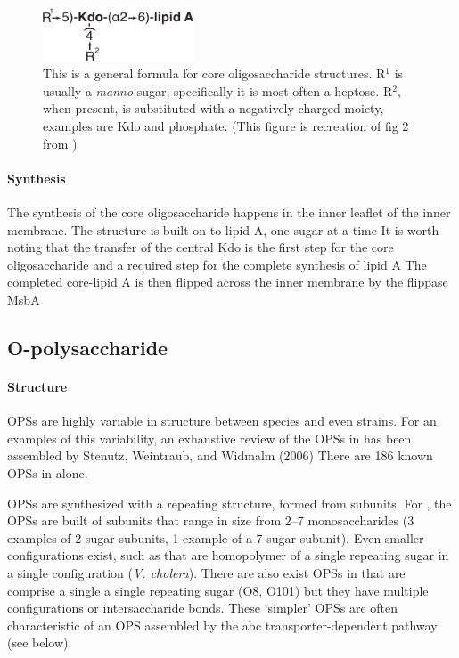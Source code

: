 \begin{figure}[htb]
  	\begin{center}
   		\includegraphics[width=0.4\textwidth]{intro/img/coreformula.pdf}
   	\end{center}
   	\caption[A generalized formula for core oligosaccharides]{This is a general formula for core oligosaccharide structures. R$^1$ is usually a \textit{manno} sugar, specifically it is most often a heptose. R$^2$, when present, is substituted with a negatively charged moiety, examples are Kdo and phosphate. (This figure is recreation of fig 2 from )
}
\label{fig:coreformula}
\end{figure}   

    \paragraph{Synthesis}
 The synthesis of the core oligosaccharide happens in the inner leaflet of the inner membrane. The structure is built on to lipid A, one sugar at a time It is worth noting that the transfer of the central Kdo is the first step for the core oligosaccharide and a required step for the complete synthesis of lipid A The completed core-lipid A is then flipped across the inner membrane by the flippase MsbA

  \subsection{O-polysaccharide}\label{sec:o-polysaccharide}

    \paragraph{Structure}
    \Acp{OPS} are highly variable in structure between species and even strains. For an examples of this variability, an exhaustive review of the \acp{OPS} in \ecoli has been assembled by Stenutz, Weintraub, and Widmalm (2006) There are 186 known \acp{OPS} in \ecoli alone. 

\Acp{OPS} are synthesized with a repeating structure, formed from subunits. For \ecoli, the \acp{OPS} are built of subunits that range in size from 2--7 monosaccharides (3 examples of 2 sugar subunits, 1 example of a 7 sugar subunit).  Even smaller configurations exist, such as that are homopolymer of a single repeating sugar in a single configuration (\eg \textit{V. cholera}). There are also exist \acp{OPS} in \ecoli that are comprise a single a single repeating sugar (O8, O101) but they have multiple configurations or intersaccharide bonds. These `simpler' \acp{OPS} are often characteristic of an \ac{OPS} assembled by the \ac{abc} transporter-dependent pathway (see below). 
 
